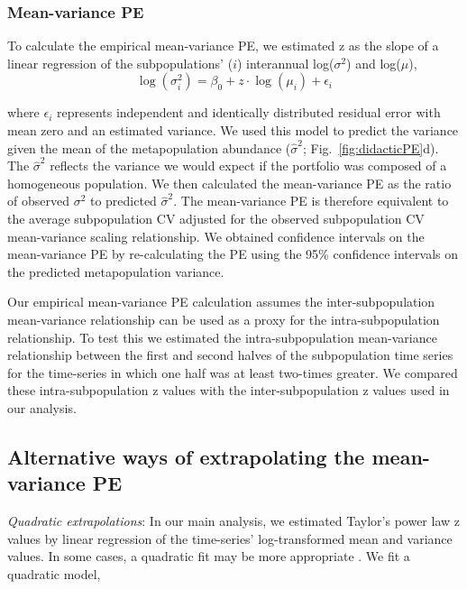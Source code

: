 \subsubsection{Mean-variance PE}

To calculate the empirical mean-variance PE, we estimated z as the slope of a
linear regression of the subpopulations' ($i$) interannual log($\sigma^2$) and
log($\mu$),
\begin{equation}
  \log(\sigma^2_i) = \beta_0 + z \cdot \log(\mu_i) + \epsilon_i
  \label{eq:linear-taylor}
\end{equation}

\noindent where $\epsilon_i$ represents independent and identically distributed
residual error with mean zero and an estimated variance. We used this model to
predict the variance given the mean of the metapopulation abundance
($\hat\sigma^2$; Fig.~\ref{fig:didacticPE}d). The $\hat\sigma^2$ reflects the
variance we would expect if the portfolio was composed of a homogeneous
population. We then calculated the mean-variance PE as the ratio of
observed $\sigma^2$ to predicted $\hat\sigma^2$. The mean-variance PE is
therefore equivalent to
the average subpopulation CV adjusted for the observed subpopulation CV
mean-variance scaling relationship.
We obtained confidence intervals on the mean-variance PE by
re-calculating the PE using the 95\% confidence intervals on the predicted
metapopulation variance.

Our empirical mean-variance PE calculation assumes the inter-subpopulation
mean-variance relationship can be used as a proxy for the intra-subpopulation
relationship. To test this we estimated the intra-subpopulation mean-variance
relationship between the first and second halves of the subpopulation time
series for the time-series in which one half was at least two-times greater. We
compared these intra-subpopulation z values with the inter-subpopulation z
values used in our analysis.

\subsection{Alternative ways of extrapolating the mean-variance PE}

\textit{Quadratic extrapolations}: In our main analysis, we estimated Taylor's
power law z values by linear regression of the time-series' log-transformed mean
and variance values. In some cases, a quadratic fit may be more appropriate
\citep{routledge1991, perry1992}. We fit a quadratic model,

